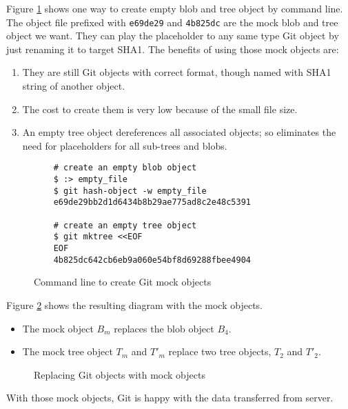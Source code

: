 \documentclass[preprint]{sigplanconf}
\begin{document}
Figure \ref{fig:cmd-create-mock} shows one way to create empty blob and tree
object by command line.
The object file prefixed with \verb|e69de29| and \verb|4b825dc| are the mock
blob and tree object we want.
They can play the placeholder to any same type Git object by just renaming it
to target SHA1.
The benefits of using those mock objects are:
\begin{enumerate}
  \item They are still Git objects with correct format, though named with SHA1
    string of another object.

  \item The cost to create them is very low because of the small file size.

  \item An empty tree object dereferences all associated objects;
    so eliminates the need for placeholders for all sub-trees and blobs.
\end{enumerate}


\begin{figure}[htpb]
  \centering
  \begin{verbatim}
    # create an empty blob object
    $ :> empty_file
    $ git hash-object -w empty_file
    e69de29bb2d1d6434b8b29ae775ad8c2e48c5391

    # create an empty tree object
    $ git mktree <<EOF
    EOF
    4b825dc642cb6eb9a060e54bf8d69288fbee4904
  \end{verbatim}
  \caption{Command line to create Git mock objects}
  \label{fig:cmd-create-mock}
\end{figure}

Figure \ref{fig:mock-objects} shows the resulting diagram with the mock
objects.

\begin{itemize}
  \item The mock object $B_m$ replaces the blob object $B_4$.

  \item The mock tree object $T_m$ and $T'_m$ replace two tree objects, $T_2$
    and $T'_2$.
\end{itemize}

\begin{figure}[htpb]
  \centering
  
  \caption{Replacing Git objects with mock objects}
  \label{fig:mock-objects}
\end{figure}

With those mock objects, Git is happy with the data transferred from server.
\end{document}
